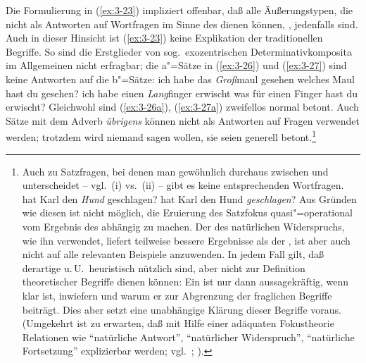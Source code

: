 \documentclass[output=paper]{langsci/langscibook}
\begin{document}
Die Formulierung in (\ref{ex:3-23}) impliziert offenbar, daß alle Äußerungstypen,
die nicht als Antworten auf Wortfragen im Sinne des  dienen können, , \dash jedenfalls  sind. Auch in dieser Hinsicht
ist (\ref{ex:3-23}) keine Explikation der traditionellen Begriffe. So sind die
Erstglieder von sog.\ exozentrischen Determinativkomposita im Allgemeinen nicht
erfragbar; die a"=Sätze in (\ref{ex:3-26}) und (\ref{ex:3-27}) sind keine Antworten auf die
b"=Sätze:
\eal \label{ex:3-26}
\ex
\label{ex:3-26a}
ich habe das \textit{Groß}maul gesehen
\ex
\label{ex:3-26b}
welches Maul hast du gesehen?
\zl
\eal \label{ex:3-27}
\ex
\label{ex:3-27a}
ich habe einen \textit{Lang}finger erwischt
\ex
\label{ex:3-27b}
was für einen Finger hast du erwischt?
\zl
Gleichwohl sind (\ref{ex:3-26a}), (\ref{ex:3-27a}) zweifellos normal betont. Auch Sätze
mit dem Adverb \textit{übrigens} können nicht als Antworten auf Fragen
verwendet werden; trotzdem wird niemand sagen wollen, sie seien
generell  betont.\footnote{\label{fn:3-7}%
  Auch zu Satzfragen, bei denen man gewöhnlich durchaus zwischen  und
    unterscheidet -- vgl.\ (i) vs.\ (ii) -- gibt es keine
  entsprechenden Wortfragen. 
  \ea
  \label{ex:3-fn7i}
  hat Karl den \textit{Hund} geschlagen?
  \ex
  \label{ex:3-fn7ii}
  hat Karl den Hund \textit{geschlagen}?
  \z 
  Aus Gründen wie diesen ist nicht möglich, die Eruierung des Satzfokus
  quasi"=operational vom Ergebnis des  abhängig zu
  machen. Der  des natürlichen Widerspruchs, wie ihn \citet{Chomsky76a} verwendet,
  liefert teilweise bessere Ergebnisse als der , ist aber auch nicht auf alle
  relevanten Beispiele anzuwenden. In jedem Fall gilt, daß derartige  u.\,U.\ heuristisch
  nützlich sind, aber nicht zur Definition theoretischer Begriffe dienen können: Ein 
  ist nur dann aussagekräftig, wenn klar ist, inwiefern und warum er zur Abgrenzung
  der fraglichen Begriffe beiträgt. Dies aber setzt eine unabhängige
  Klärung dieser Begriffe voraus. (Umgekehrt ist zu erwarten, daß mit
  Hilfe einer adäquaten Fokustheorie Relationen wie "`natürliche
  Antwort"', "`natürlicher Widerspruch"', "`natürliche Fortsetzung"'
  explizierbar werden; vgl.\ \zb \citet[100]{Chomsky76a};
  \citet{Stechow80a}).%
}
\end{document}
